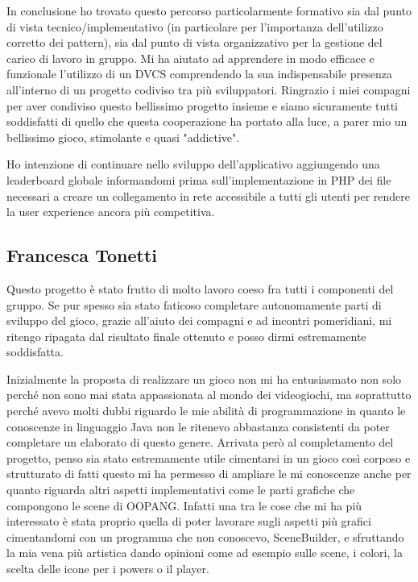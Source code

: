 \documentclass[a4paper,12pt]{report}
\begin{document}
In conclusione ho trovato questo percorso particolarmente formativo sia dal punto di vista tecnico/implementativo (in particolare per l'importanza dell'utilizzo corretto dei pattern), sia dal punto di vista organizzativo per la gestione del carico di lavoro in gruppo.
Mi ha aiutato ad apprendere in modo efficace e funzionale l'utilizzo di un DVCS comprendendo la sua indispensabile presenza all'interno di un progetto codiviso tra più sviluppatori.
Ringrazio i miei compagni per aver condiviso questo bellissimo progetto insieme e siamo sicuramente tutti soddisfatti di quello che questa cooperazione ha portato alla luce, a parer mio un bellissimo gioco, stimolante e quasi "addictive". 

Ho intenzione di continuare nello sviluppo dell'applicativo aggiungendo una leaderboard globale informandomi prima sull'implementazione in PHP dei file necessari a creare un collegamento in rete accessibile a tutti gli utenti per rendere la user experience ancora più competitiva.

\subsection*{Francesca Tonetti}
Questo progetto è stato frutto di molto lavoro coeso fra tutti i componenti del gruppo.
Se pur spesso sia stato faticoso completare autonomamente parti di sviluppo del gioco, grazie all'aiuto dei compagni e ad incontri pomeridiani, mi ritengo ripagata dal risultato finale ottenuto e posso dirmi estremamente soddisfatta.

Inizialmente la proposta di realizzare un gioco non mi ha entusiasmato non solo perché non sono mai stata appassionata al mondo dei videogiochi, ma soprattutto perché avevo molti dubbi riguardo le mie abilità di programmazione in quanto le conoscenze in linguaggio Java non le ritenevo abbastanza consistenti da poter completare un elaborato di questo genere.
Arrivata però al completamento del progetto, penso sia stato estremamente utile cimentarsi in un gioco così corposo e strutturato di fatti questo mi ha permesso di ampliare le mi conoscenze anche per quanto riguarda altri aspetti implementativi come le parti grafiche che compongono le scene di OOPANG.
Infatti una tra le cose che mi ha più interessato è stata proprio quella di poter lavorare sugli aspetti più grafici cimentandomi con un programma che non conoscevo, SceneBuilder, e sfruttando la mia vena più artistica dando opinioni come ad esempio sulle scene, i colori, la scelta delle icone per i powers o il player.
\end{document}
